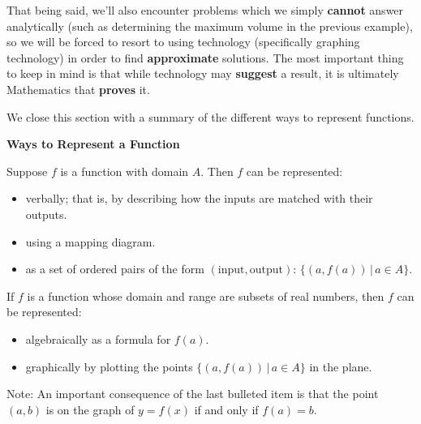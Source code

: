 \documentclass{ximera}
\begin{document}
 

That being said, we'll also encounter problems which we simply \textbf{cannot} answer analytically (such as determining the maximum volume in the previous example), so we will be forced to resort to using technology (specifically graphing technology) in order to find \textbf{approximate} solutions.  The most important thing to keep in mind is that while technology may \textbf{suggest} a result, it is ultimately Mathematics that \textbf{proves} it. 

 

We close this section with a summary of the different ways to represent functions.

\bigskip

 

\centerline{\textbf{Ways to Represent a Function}} \label{waystorepresentfunctionsbox}

\smallskip

Suppose $f$ is a function with domain $A$.  Then $f$ can be represented:

\begin{itemize}

\item  verbally; that is, by describing how the inputs are matched with their outputs.

\item using a mapping diagram.

\item  as a set of ordered pairs of the form $(\text{input}, \text{output})$:  $\{ (a, f(a)) \, | \, a \in A \}$.

\end{itemize}

If $f$ is a function whose domain and range are subsets of real numbers, then $f$ can be represented:

\begin{itemize}

\item  algebraically as a formula for $f(a)$.

\item  graphically by plotting the points $\{ (a, f(a))  \, | \, a \in A \}$ in the plane.

\end{itemize}

Note: An important consequence of the last bulleted item is that the point $(a, b)$ is on the graph of $y = f(x)$ if and only if $f(a) = b.$\label{FundamentalGraphingPrinciple}

 

  

%

\end{document}
